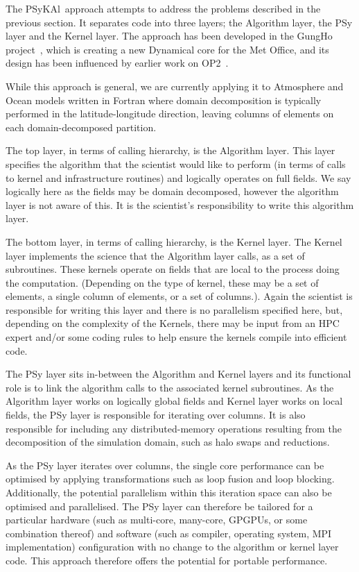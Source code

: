 \documentclass{IOS-Book-Article}
\newcommand{\psykal}{{PS}y{KA}l}
\begin{document}
The \psykal\ approach attempts to address the problems described in the
previous section. It separates code into three layers; the Algorithm
layer, the PSy layer and the Kernel layer. The approach has been
developed in the GungHo project~\cite{GungHo}, which is creating a new
Dynamical core for the Met Office, and its design has been influenced
by earlier work on OP2~\cite{OP2,PYOP2}.

While this approach is general, we are currently applying it to
Atmosphere and Ocean models written in Fortran where domain
decomposition is typically performed in the latitude-longitude
direction, leaving columns of elements on each domain-decomposed
partition.

The top layer, in terms of calling hierarchy, is the Algorithm
layer. This layer specifies the algorithm that the scientist would like
to perform (in terms of calls to kernel and infrastructure routines)
and logically operates on full fields. We say logically here as the
fields may be domain decomposed, however the algorithm layer is not
aware of this. It is the scientist's responsibility to write this
algorithm layer.

The bottom layer, in terms of calling hierarchy, is the Kernel
layer. The Kernel layer implements the science that the Algorithm
layer calls, as a set of subroutines. These kernels operate on fields
that are local to the process doing the computation. (Depending on the
type of kernel, these may be a set of elements, a single column of
elements, or a set of columns.). Again the scientist is responsible
for writing this layer and there is no parallelism specified here,
but, depending on the complexity of the Kernels, there may be input
from an HPC expert and/or some coding rules to help ensure the kernels
compile into efficient code.

The PSy layer sits in-between the Algorithm and Kernel layers and its
functional role is to link the algorithm calls to the associated
kernel subroutines. As the Algorithm layer works on logically global
fields and Kernel layer works on local fields, the PSy layer is
responsible for iterating over columns. It is also responsible for
including any distributed-memory operations resulting from the
decomposition of the simulation domain, such as halo swaps and
reductions.

As the PSy layer iterates over columns, the single core performance
can be optimised by applying transformations such as loop fusion and
loop blocking. Additionally, the potential parallelism within this
iteration space can also be optimised and parallelised. The PSy layer
can therefore be tailored for a particular hardware (such as
multi-core, many-core, GPGPUs, or some combination thereof) and
software (such as compiler, operating system, MPI implementation)
configuration with no change to the algorithm or kernel layer
code. This approach therefore offers the potential for portable
performance.
\end{document}
